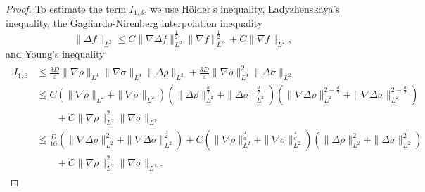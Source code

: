 \documentclass[10pt,twoside,reqno]{amsart}
\numberwithin{figure}{section}
\numberwithin{equation}{section}
\theoremstyle{definition}
\newcommand{\1}{\mathbbm{1}}
\newcommand{\ve}{\varepsilon}
\begin{document}
\begin{proof}
To estimate the term $I_{1, 3}$, we use H\"{o}lder's inequality, Ladyzhenskaya's inequality, the Gagliardo-Nirenberg interpolation inequality
\[
\|\Delta f\|_{L^2} \leq C \|\nabla \Delta f\|_{L^2}^{\frac{1}{2}} \|\nabla f\|_{L^2}^{\frac{1}{2}} + C \|\nabla f\|_{L^2},
\]
and Young's inequality
\begin{align}
\label{DtH2est4}
\begin{split}
I_{1, 3} & \leq \frac{3 D}{\ve} \|\nabla \rho\|_{L^4} \|\nabla \sigma\|_{L^4} \|\Delta \rho\|_{L^2} + \frac{3 D}{\ve} \|\nabla \rho\|_{L^4}^2 \|\Delta \sigma\|_{L^2}\\
& \leq C \left(\|\nabla \rho\|_{L^2} + \|\nabla \sigma\|_{L^2}\right) \left(\|\Delta \rho\|_{L^2}^{\frac{d}{2}} + \|\Delta \sigma\|_{L^2}^{\frac{d}{2}}\right) \left(\|\nabla \Delta \rho\|_{L^2}^{2 - \frac{d}{2}} + \|\nabla \Delta \sigma\|_{L^2}^{2 - \frac{d}{2}}\right)\\
& \qquad + C \|\nabla \rho\|_{L^2}^2 \|\nabla \sigma\|_{L^2}\\
& \leq \frac{D}{10} \left(\|\nabla \Delta \rho\|_{L^2}^2 + \|\nabla \Delta \sigma\|_{L^2}^2\right) + C \left(\|\nabla \rho\|_{L^2}^{\frac{4}{d}} + \|\nabla \sigma\|_{L^2}^{\frac{4}{d}}\right) \left(\|\Delta \rho\|_{L^2}^2 + \|\Delta \sigma\|_{L^2}^2\right)\\
& \qquad + C \|\nabla \rho\|_{L^2}^2 \|\nabla \sigma\|_{L^2}.
\end{split}
\end{align}


\end{proof}
\end{document}
